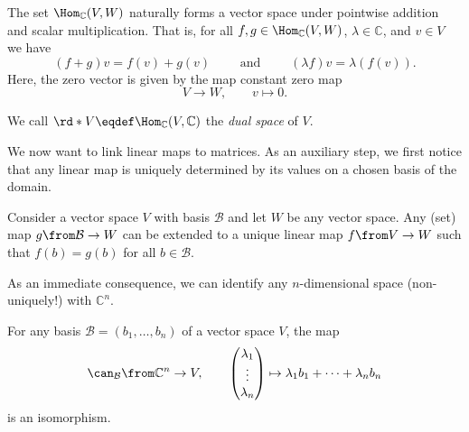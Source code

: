 \documentclass[a4paper,oneside, 12pt]{amsart}
\begin{document}
\begin{remark}\label{rmk:vector-space-structure}
  The set \( \Hom_{\mathbb{C}}(V, W) \) naturally forms a vector space under pointwise addition and scalar multiplication.
  That is, for all \(f, g \in \Hom_{ \mathbb{C}}(V,W)\), \(\lambda \in \mathbb{C}\), and \(v\in V\) we have
  \begin{equation*}
    (f+g)v = f(v) + g(v)\qquad \text{ and } \qquad
    (\lambda f)v = \lambda (f (v)).
  \end{equation*}
  Here, the zero vector is given by the map constant zero map
  \begin{equation*}
    V\to W, \qquad v \mapsto 0.
  \end{equation*}
\end{remark}

\begin{definition}\label{def:dual space}
  We call \(\rd*{V} \eqdef \Hom_{ \mathbb{C}}(V,   \mathbb{C} )\) the \emph{dual space} of \(V\).
\end{definition}

We now want to link linear maps to matrices.
As an auxiliary step, we first notice that any linear map is uniquely determined by its values on a chosen basis of the domain.

\begin{theorem}\label{thm:universal-property-free-vector-space}
  Consider a vector space \(V\) with basis \( \mathcal{B}\) and let \(W\) be any vector space.
  Any (set) map \(g \from \mathcal{B} \to W\) can be extended to a unique linear map \(f\from V \to W\) such that \(f(b) = g(b)\) for all \(b\in \mathcal{B}\).
\end{theorem}

As an immediate consequence, we can identify any \(n\)-dimensional space (non-uniquely!) with \( \mathbb{C}^{n}\).

\begin{corollary}\label{cor:basis-isomorphism}
  For any basis \( \mathcal{B} = (b_{1}, \dots , b_{n})\)  of a vector space \(V\), the map
  \begin{equation}
    \can_{\mathcal{B}} \from
    \mathbb{C}^{n} \to V, \qquad
    \begin{pmatrix}
      \lambda_{1}\\ \vdots \\ \lambda_{n}
    \end{pmatrix}
    \mapsto
    \lambda_{1} b_{1} + \dots + \lambda_{n} b_{n}
  \end{equation}
  is an isomorphism.
\end{corollary}
\end{document}
